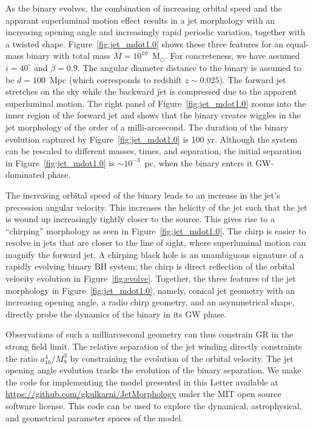 \documentclass[a4paper,fleqn,usenatbib]{mnras}
\begin{document}
As the binary evolves, the combination of increasing orbital speed and
the apparant superluminal motion effect results in a jet morphology
with an increasing opening angle and increasingly rapid periodic
variation, together with a twisted shape.
Figure~\ref{fig:jet_mdot1.0} shows these three features for an
equal-mass binary with total mass $M=10^{10}$~M$_\odot$.  For
concreteness, we have assumed $i=40^\circ$ and $\beta=0.9$.  The
angular diameter distance to the binary is assumed to be $d = 100$~Mpc
(which corresponds to redshift $z\sim 0.025$).  The forward jet
stretches on the sky while the backward jet is compressed due to the
apparent superluminal motion.  The right panel of
Figure~\ref{fig:jet_mdot1.0} zooms into the inner region of the
forward jet and shows that the binary creates wiggles in the jet
morphology of the order of a milli-arcsecond.  The duration of the
binary evolution captured by Figure~\ref{fig:jet_mdot1.0} is 100 yr.
Although the system can be rescaled to different masses, times, and
separation, the initial separation in Figure~\ref{fig:jet_mdot1.0} is
$\sim 10^{-3}$~pc, when the binary enters it GW-dominated phase.

The increasing orbital speed of the binary leads to an increase in the
jet's precession angular velocity.  This increases the helicity of the
jet such that the jet is wound up increasingly tightly closer to the
source.  This gives rise to a ``chirping'' morphology as seen in
Figure~\ref{fig:jet_mdot1.0}.  The chirp is easier to resolve in jets
that are closer to the line of sight, where superluminal motion can
magnify the forward jet.  A chirping black hole is an unambiguous
signature of a rapidly evolving binary BH system; the chirp is direct
reflection of the orbital velocity evolution in
Figure~\ref{fig:evolve}.  Together, the three features of the jet
morphology in Figure~\ref{fig:jet_mdot1.0}, namely, conical jet
geometry with an increasing opening angle, a radio chirp geometry, and
an asymmetrical shape, directly probe the dynamics of the binary in
its GW phase.

Observations of such a milliarcsecond geometry can thus constrain GR
in the strong field limit.  The relative separation of the jet winding
directly constraints the ratio $a_{16}^4/M_8^3$ by constraining the
evolution of the orbital velocity.  The jet opening angle evolution
tracks the evolution of the binary separation.  We make the code for
implementing the model presented in this Letter available at
\url{https://github.com/gkulkarni/JetMorphology} under the MIT open
source software license.  This code can be used to explore the
dynamical, astrophysical, and geometrical parameter spaces of the
model.
\end{document}
